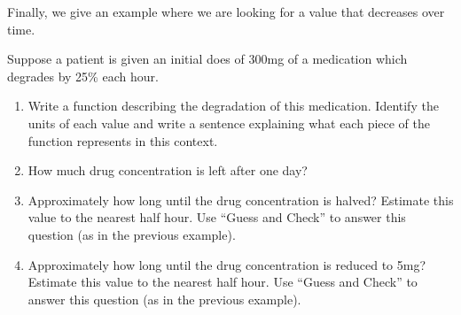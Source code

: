 \documentclass{ximera}
\begin{document}
Finally, we give an example where we are looking for a value that decreases over time.

\begin{example}
Suppose a patient is given an initial does of 300mg of a medication which degrades by 25\% each hour. 

\begin{enumerate}
\item Write a function describing the degradation of this medication. Identify the units of each value and write a sentence explaining what each piece of the function represents in this context. 
%
\item How much drug concentration is left after one day? 
%
\item Approximately how long until the drug concentration is halved?  Estimate this value to the nearest half hour.
Use ``Guess and Check'' to answer this question (as in the previous example).
%
\item Approximately how long until the drug concentration is reduced to 5mg?  Estimate this value to the nearest half hour.
Use ``Guess and Check'' to answer this question (as in the previous example).
\end{enumerate}
\end{example}
\end{document}

